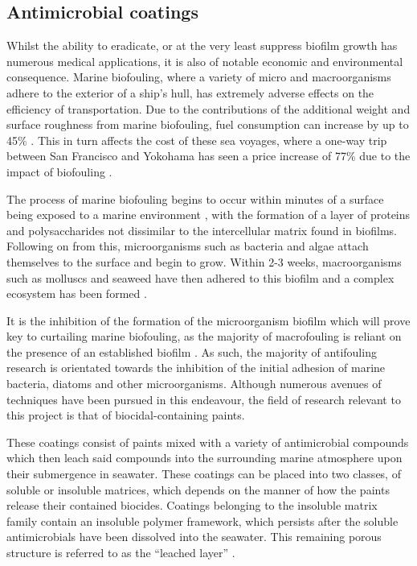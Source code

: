 \documentclass[a4paper,12pt]{article}
\begin{document}
\subsection{Antimicrobial coatings}

Whilst the ability to eradicate, or at the very least suppress biofilm growth has numerous medical applications, it is also of notable economic and environmental consequence.  Marine 
biofouling, where a variety of micro and macroorganisms adhere to the exterior of a ship's hull, has extremely adverse effects on the efficiency of transportation.  Due to the 
contributions of the additional weight and surface roughness from marine biofouling, fuel consumption can increase by up to 45\% \cite{bioref:biofilm-fuel-consumption}.  This in 
turn affects the cost of these sea voyages, where a one-way trip between San Francisco and Yokohama has seen a price increase of 77\% due to the impact of 
biofouling \cite{bioref:Abbot-biofoul-price-2000}.

The process of marine biofouling begins to occur within minutes of a surface being exposed to a marine environment \cite{bioref:Callow-biofoul-onset-time-1994}, with the formation 
of a layer of proteins and polysaccharides not dissimilar to the intercellular matrix found in biofilms.  Following on from this, microorganisms such as bacteria and algae attach 
themselves to the surface and begin to grow.  Within 2-3 weeks, macroorganisms such as molluscs and seaweed have then adhered to this biofilm and a complex ecosystem has been formed 
\cite{bioref:Chambers-modern-antifoul-coatings-2006}.

It is the inhibition of the formation of the microorganism biofilm which will prove key to curtailing marine biofouling, as the majority of macrofouling is reliant on the presence 
of an established biofilm \cite{bioref:Abarzua-macrofoul-dependent-1995}.  As such, the majority of antifouling research is orientated towards the inhibition of the initial adhesion 
of marine bacteria, diatoms and other microorganisms.  Although numerous avenues of techniques have been pursued in this endeavour, the field of research relevant to this project 
is that of biocidal-containing paints.

These coatings consist of paints mixed with a variety of antimicrobial compounds which then leach said compounds into the surrounding marine atmosphere upon their submergence 
in seawater.  These coatings can be placed into two classes, of soluble or insoluble matrices, which depends on the manner of how the paints release their contained biocides.  
Coatings belonging to the insoluble matrix family contain an insoluble polymer framework, which persists after the soluble antimicrobials have been dissolved into the seawater.  This 
remaining porous structure is referred to as the ``leached layer'' \cite{bioref:Cao-bifoul-coatings-review-2011}.
\end{document}
